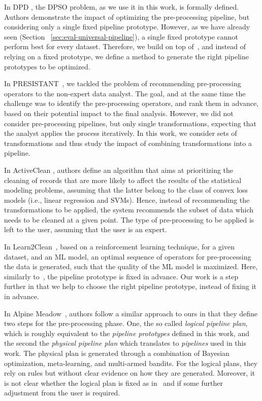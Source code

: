 In DPD \cite{Quemy20InfSystems}, the DPSO problem, as we use it in this work, is formally defined. Authors demonstrate the impact of optimizing the pre-processing pipeline, but considering only a single fixed pipeline prototype. %
However, as we have already seen (Section~
\ref{sec:eval-universal-pipeline}), a single fixed prototype cannot perform best for every dataset. Therefore, we build on top of~\cite{Quemy20InfSystems}, and instead of relying on a fixed prototype, we define a method to generate the right pipeline prototypes to be optimized.

In PRESISTANT~\cite{presistant18CSI,presistant18CAISE,presistant19DKE}, we tackled the problem of recommending pre-processing operators to the non-expert data analyst. The goal, and at the same time the challenge was to identify the pre-processing operators, and rank them in advance, based on their potential impact to the final analysis. However, we did not consider pre-processing pipelines, but only single transformations, expecting that the analyst applies the process iteratively. In this work, we consider sets of transformations and thus study the impact of combining transformations into a pipeline. 

In ActiveClean \cite{ActiveClean16PVLDB}, authors define an algorithm that aims at prioritizing the cleaning of records that are more likely to affect the results of the statistical modeling problems, assuming that the latter belong to the class of convex loss models (i.e., linear regression and SVMs). Hence, instead of recommending the transformations to be applied, the system recommends the subset of data which needs to be cleaned at a given point. The type of pre-processing to be applied is left to the user, assuming that the user is an expert. 

In Learn2Clean~\cite{Berti19WWW}, based on a reinforcement learning technique, for a given dataset, and an ML model, an optimal sequence of operators for pre-processing the data is generated,
such that the quality of the ML model is maximized. Here, similarly to~\cite{Quemy20InfSystems}, the pipeline prototype is fixed in advance. Our work is a step further in that we help to choose the right pipeline prototype, instead of fixing it in advance. 

In Alpine Meadow~\cite{Shang19SIGMOD}, authors follow a similar approach to ours in that they define two steps for the pre-processing phase. One, the so called \textit{logical pipeline plan}, which is roughly equivalent to the \textit{pipeline prototypes} defined in this work, and the second the \textit{physical pipeline plan} which translates to \textit{pipelines} used in this work. The physical plan is generated through a combination of Bayesian optimization, meta-learning, and multi-armed bandits. For the logical plans, they rely on rules but without clear evidence on how they are generated. Moreover, it is not clear whether the logical plan is fixed as in~\cite{Quemy20InfSystems} and if some further adjustment from the user is required. 

